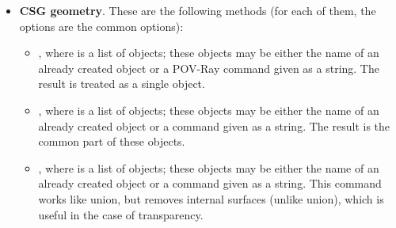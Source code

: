 \begin{itemize}
\begin{itemize}
            \item {}, which draws a cylinder along the axis $(AB)$ from  to  (3D points), with radius . These are the common options plus the specific option , indicating whether the cylinder is hollow or not.
    
            \item {}, which draws a cone along the axis $(AB)$ from  to  (3D points), with radius  at end  and radius  at end . The radius  is optional and defaults to \(0\); in that case,  is the apex of the cone. These are the common options plus the specific option , indicating whether the cone is hollow or not.
    
            \item {}, which draws a box whose faces are parallel to those of the 3D window of the graphic. The 3D points  and  define a diagonal of the box, more precisely  $=$ M(xinf, yinf, zinf) and  $=$ M(xsup, ysup, zsup). These are the common options.
        \end{itemize}
            
    \item \textbf{CSG geometry}. These are the following methods (for each of them, the options are the common options):
        \begin{itemize}
            \item {}, where  is a list of \povray objects; these objects may be either the name of an already created object or a POV-Ray command given as a string. The result is treated as a single object.
            
            \item {}, where  is a list of \povray objects; these objects may be either the name of an already created object or a \povray command given as a string. The result is the common part of these objects.
            
            \item {}, where  is a list of \povray objects; these objects may be either the name of an already created object or a \povray command given as a string. This command works like union, but removes internal surfaces (unlike union), which is useful in the case of transparency.
            

\end{itemize}
\end{itemize}
